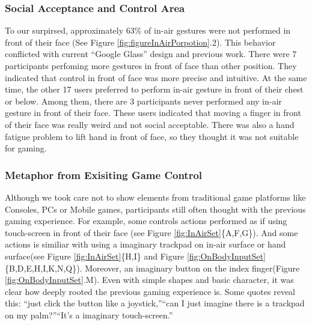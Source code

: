 \documentclass{sigchi}
\begin{document}
    \subsubsection{Social Acceptance and Control Area}
    To our surpirsed, approximately 63\% of in-air gestures were not performed in front of their face (See Figure \ref{fig:figureInAirPorpotion}.2). This behavior conflicted with current ``Google Glass'' design and previous work\cite{Colaco:2013:MCL:2501988.2502042}. There were 7 participants perfoming more gestures in front of face than other position. They indicated that control in front of face was more precise and intuitive. At the same time, the other 17 users preferred to perform in-air gesture in front of their chest or below. Among them, there are 3 participants never performed any in-air gesture in front of their face. These users indicated that moving a finger in front of their face was really weird and not social acceptable. There was also a hand fatigue problem to lift hand in front of face, so they thought it was not suitable for gaming.

    \subsubsection{Metaphor from Exisiting Game Control}
    Although we took care not to show elements from traditional game platforms like Consoles, PCs or Mobile games, participants still often thought with the previous gaming experience. For example, some controls actions performed as if using touch-screen in front of their face (see Figure \ref{fig:InAirSet}\{A,F,G\}). And some actions is similiar with using a imaginary trackpad on in-air surface or hand surface(see Figure \ref{fig:InAirSet}\{H,I\} and Figure \ref{fig:OnBodyInputSet}\{B,D,E,H,I,K,N,Q\}). Moreover, an imaginary button on the index finger(Figure \ref{fig:OnBodyInputSet}.M). Even with simple shapes and basic character, it was clear how deeply rooted the previous gaming experience is. Some quotes reveal this: ``just click the button like a joystick,''``can I just imagine there is a trackpad on my palm?''``It's a imaginary touch-screen.''
\end{document}

